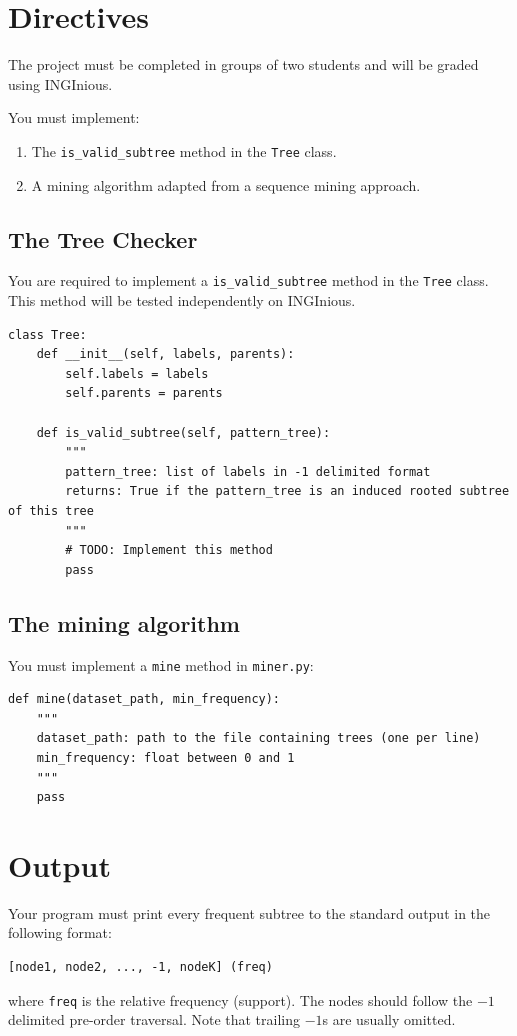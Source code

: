 \documentclass[]{article}
\begin{document}
\section{Directives}
	The project must be completed in groups of two students and will be graded using INGInious.
	
	You must implement:
	\begin{enumerate}
	    \item The \texttt{is\_valid\_subtree} method in the \texttt{Tree} class.
	    \item A mining algorithm adapted from a sequence mining approach.
	\end{enumerate}
	

\subsection{The Tree Checker}

You are required to implement a \texttt{is\_valid\_subtree} method in the \texttt{Tree} class. This method will be tested independently on INGInious.

\begin{lstlisting}
class Tree:
    def __init__(self, labels, parents):
        self.labels = labels
        self.parents = parents

    def is_valid_subtree(self, pattern_tree):
        """
        pattern_tree: list of labels in -1 delimited format
        returns: True if the pattern_tree is an induced rooted subtree of this tree
        """
        # TODO: Implement this method
        pass
\end{lstlisting}

\subsection{The mining algorithm}

You must implement a \texttt{mine} method in \texttt{miner.py}:
\begin{lstlisting}
def mine(dataset_path, min_frequency):
    """
    dataset_path: path to the file containing trees (one per line)
    min_frequency: float between 0 and 1
    """
    pass
\end{lstlisting}


\section{Output}

Your program must print every frequent subtree to the standard output in the following format:
\begin{verbatim}
[node1, node2, ..., -1, nodeK] (freq)
\end{verbatim}
where \texttt{freq} is the relative frequency (support). The nodes should follow the $-1$ delimited pre-order traversal. Note that trailing $-1$s are usually omitted.
\end{document}
